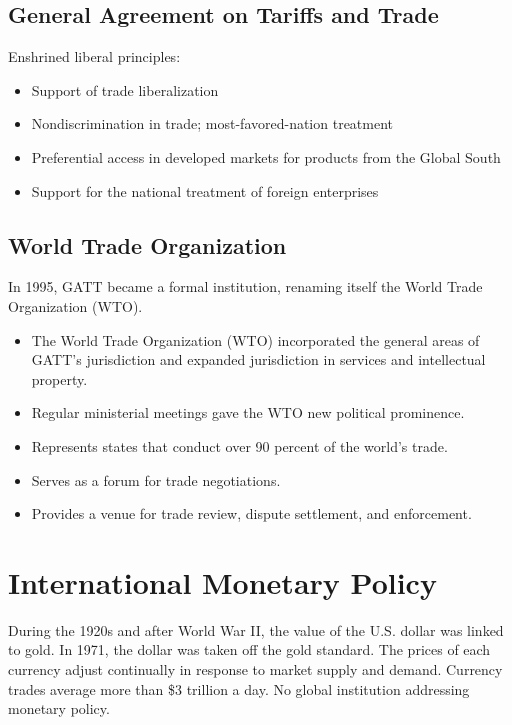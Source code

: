 \documentclass[
]{book}
\begin{document}
\hypertarget{general-agreement-on-tariffs-and-trade}{%
\subsection{General Agreement on Tariffs and Trade}\label{general-agreement-on-tariffs-and-trade}}

Enshrined liberal principles:

\begin{itemize}
\item
  Support of trade liberalization
\item
  Nondiscrimination in trade; most-favored-nation treatment
\item
  Preferential access in developed markets for products from the Global South
\item
  Support for the national treatment of foreign enterprises
\end{itemize}

\hypertarget{world-trade-organization}{%
\subsection{World Trade Organization}\label{world-trade-organization}}

In 1995, GATT became a formal institution, renaming itself the World Trade Organization (WTO).

\begin{itemize}
\item
  The World Trade Organization (WTO) incorporated the general areas of GATT's jurisdiction and expanded jurisdiction in services and intellectual property.
\item
  Regular ministerial meetings gave the WTO new political prominence.
\item
  Represents states that conduct over 90 percent of the world's trade.
\item
  Serves as a forum for trade negotiations.
\item
  Provides a venue for trade review, dispute settlement, and enforcement.
\end{itemize}

\hypertarget{international-monetary-policy}{%
\section{International Monetary Policy}\label{international-monetary-policy}}

During the 1920s and after World War II, the value of the U.S. dollar was linked to gold. In 1971, the dollar was taken off the gold standard. The prices of each currency adjust continually in response to market supply and demand. Currency trades average more than \$3 trillion a day. No global institution addressing monetary policy.
\end{document}
